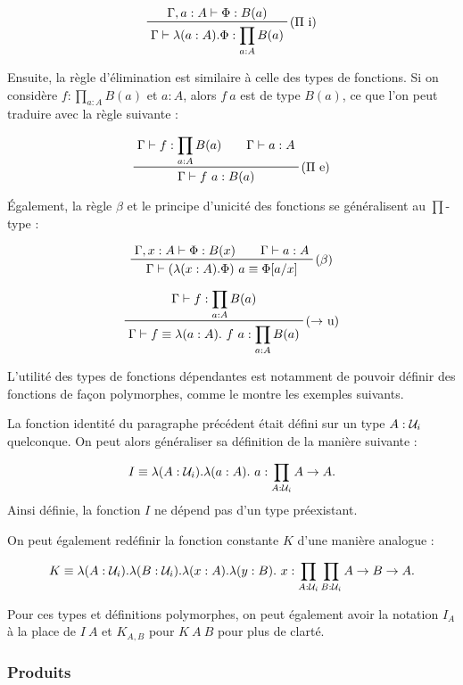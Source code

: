 \documentclass[../../rapport.tex]{subfiles}
\begin{document}
  $$
  \prftree[r]{($\Pi$ i)}{\Gamma, a : A \vdash \Phi : B(a)}
    {\Gamma \vdash \lambda(a : A). \Phi : \prod_{a:A}{B(a)}}
  $$

  Ensuite, la règle d'élimination est similaire à celle des types de fonctions.
  Si on considère $f : \prod_{a:A}B(a)$ et $a : A$, alors $f\ a$ est de type $B(a)$,
  ce que l'on peut traduire avec la règle suivante :

  $$
  \prfinterspace=2em
  \prftree[r]{($\Pi$ e)}{\Gamma \vdash f : \prod_{a:A}{B(a)}}{\Gamma \vdash a : A}
    {\Gamma \vdash f\ a : B(a)}
  $$

  Également, la règle $\beta$ et le principe d'unicité des fonctions se généralisent au $\prod$-type :

  $$
  \prfinterspace=2em
  \prftree[r]{($\beta$)}{\Gamma, x : A \vdash \Phi : B(x)}{\Gamma \vdash a : A}
    {\Gamma \vdash (\lambda(x : A).\Phi)\ a \equiv \Phi[a/x]}
  $$

  $$
  \prftree[r]{($\fun$ u)}
    {\Gamma \vdash f : \prod_{a : A}B(a)}
  {\Gamma \vdash f \equiv \lambda(a : A).\ f\ a : \prod_{a:A}B(a)}
  $$

  L'utilité des types de fonctions dépendantes est notamment de pouvoir définir des fonctions de façon polymorphes,
  comme le montre les exemples suivants.

  \begin{example}
    La fonction identité du paragraphe précédent était défini sur un type $A : \mathcal U_i$ quelconque.
    On peut alors généraliser sa définition de la manière suivante :

    $$I \equiv \lambda (A : \mathcal U_i). \lambda (a : A).\ a : \prod_{A : \mathcal U_i}{A \rightarrow A}.$$
    Ainsi définie, la fonction $I$ ne dépend pas d'un type préexistant.

    On peut également redéfinir la fonction constante $K$ d'une manière analogue :

    $$K \equiv \lambda (A : \mathcal U_i). \lambda (B : \mathcal U_i). \lambda (x : A). \lambda (y : B).\ x :
      \prod_{A : \mathcal U_i}\prod_{B : \mathcal U_i}{A \rightarrow B \rightarrow A}.$$

    Pour ces types et définitions polymorphes, on peut également avoir la notation $I_A$ à la place de $I\ A$ et $K_{A,B}$ pour $K\ A\ B$
    pour plus de clarté.
  \end{example}

  \subsubsection{Produits}
\end{document}
